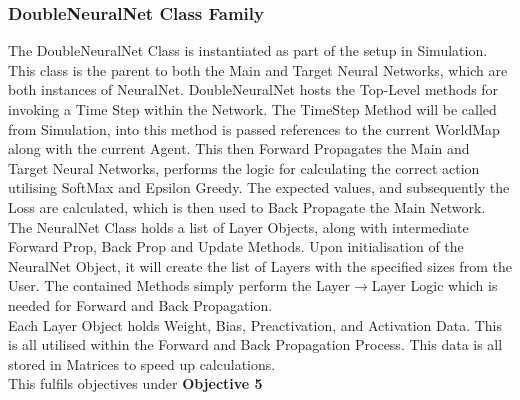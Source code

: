 \begin{flushleft}
            \subsubsection{DoubleNeuralNet Class Family}
                The DoubleNeuralNet Class is instantiated as part of the setup in Simulation. This class is the parent to both the Main and Target 
                Neural Networks, which are both instances of NeuralNet. DoubleNeuralNet hosts the Top-Level methods for invoking a Time Step
                within the Network. The TimeStep Method will be called from Simulation, into this method is passed references to the current WorldMap
                along with the current Agent. This then Forward Propagates the Main and Target Neural Networks, performs the logic for calculating the
                correct action utilising SoftMax and Epsilon Greedy. The expected values, and subsequently the Loss are calculated, which is then used
                to Back Propagate the Main Network. \\
                \vspace{0.2cm}
                The NeuralNet Class holds a list of Layer Objects, along with intermediate Forward Prop, Back Prop and Update Methods. Upon initialisation
                of the NeuralNet Object, it will create the list of Layers with the specified sizes from the User. The contained Methods simply perform
                the Layer$\to$Layer Logic which is needed for Forward and Back Propagation. \\
                \vspace{0.2cm}
                Each Layer Object holds Weight, Bias, Preactivation, and Activation Data. This is all utilised within the Forward and Back Propagation 
                Process. This data is all stored in Matrices to speed up calculations. \\
                \vspace{0.2cm}
                This fulfils objectives under \textbf{Objective 5} \\


\end{flushleft}
